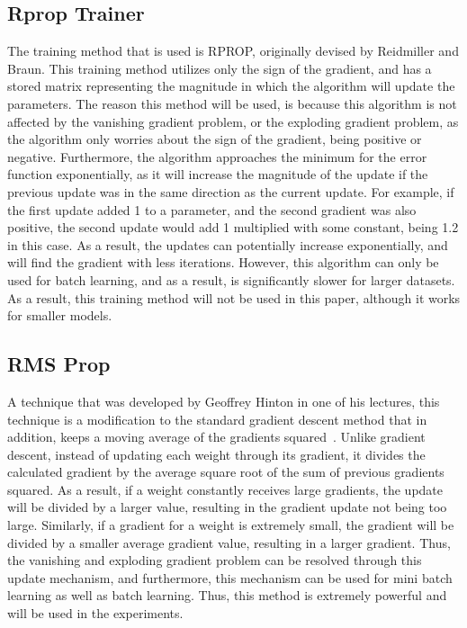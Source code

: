\documentclass{article}
\begin{document}
\subsection{Rprop Trainer}
The training method that is used is RPROP, originally devised by Reidmiller and
Braun. This training method utilizes only the sign of the gradient, and has a
stored matrix representing the magnitude in which the algorithm will update the
parameters. The reason this method will be used, is because this algorithm is
not affected by the vanishing gradient problem, or the exploding gradient
problem, as the algorithm only worries about the sign of the gradient, being
positive or negative. Furthermore, the algorithm approaches the minimum for the
error function exponentially, as it will increase the magnitude of the update
if the previous update was in the same direction as the current update. For
example, if the first update added 1 to a parameter, and the second gradient was
also positive, the second update would add 1 multiplied with some constant,
being 1.2 in this case. As a result, the updates can potentially increase
exponentially, and will find the gradient with less iterations. However, this
algorithm can only be used for batch learning, and as a result, is significantly
slower for larger datasets. As a result, this training method will not be used
in this paper, although it works for smaller models.

\subsection{RMS Prop}
A technique that was developed by Geoffrey Hinton in one of his lectures, this
technique is a modification to the standard gradient descent method that in
addition, keeps a moving average of the gradients squared~\cite{rmsprop}. Unlike
gradient descent, instead of updating each weight through its gradient, it
divides the calculated gradient by the average square root of the sum of
previous gradients squared. As a result, if a weight constantly receives large
gradients, the update will be divided by a larger value, resulting in the
gradient update not being too large. Similarly, if a gradient for a weight is
extremely small, the gradient will be divided by a smaller average gradient
value, resulting in a larger gradient. Thus, the vanishing and exploding
gradient problem can be resolved through this update mechanism, and furthermore,
this mechanism can be used for mini batch learning as well as batch learning.
Thus, this method is extremely powerful and will be used in the experiments.
\end{document}
